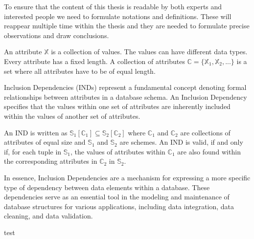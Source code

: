 To ensure that the content of this thesis is readable by both experts and interested people we need to formulate notations and definitions. These will reappear multiple time within the thesis and they are needed to formulate precise observations and draw conclusions.

\begin{definition}\label{def:attributes}
    An attribute $\mathbb{X}$ is a collection of values. The values can have different data types. Every attribute has a fixed length. A collection of attributes $\mathbb{C} = \{\mathbb{X}_1, \mathbb{X}_2, ... \}$ is a set where all attributes have to be of equal length.
\end{definition}


Inclusion Dependencies (INDs) represent a fundamental concept denoting formal relationships between attributes in a database schema. An Inclusion Dependency specifies that the values within one set of attributes are inherently included within the values of another set of attributes.

\begin{definition}\label{def:inds}
    An IND is written as $\mathbb{S}_1[\mathbb{C}_1] \subseteq \mathbb{S}_2[\mathbb{C}_2]$ where $\mathbb{C}_1$ and $\mathbb{C}_2$ are collections of attributes of equal size and $\mathbb{S}_1$ and $\mathbb{S}_2$ are schemes. An IND is valid, if and only if, for each tuple in $\mathbb{S}_1$, the values of attributes within $\mathbb{C}_1$ are also found within the corresponding attributes in $\mathbb{C}_2$ in $\mathbb{S}_2$.
\end{definition}

In essence, Inclusion Dependencies are a mechanism for expressing a more specific type of dependency between data elements within a database. These dependencies serve as an essential tool in the modeling and maintenance of database structures for various applications, including data integration, data cleaning, and data validation.

\begin{theorem}
    test
\end{theorem}